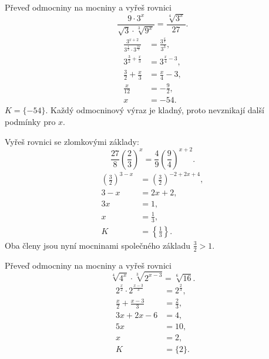 \documentclass[11pt,a4paper]{article}
\begin{document}
\begin{prikladReseniBox}[title={Příklad 5}]
Převeď odmocniny na mocniny a vyřeš rovnici
\[
\frac{9\cdot3^x}{\sqrt3\cdot\sqrt[3]{9^x}}=\frac{\sqrt[4]{3^x}}{27}.
\]
\tcblower
\[
\begin{aligned}
\frac{3^{x+2}}{3^{\frac{1}{2}}\cdot3^{\frac{2x}{3}}}&=\frac{3^{\frac{x}{4}}}{3^3},\\
3^{\frac{3}{2}+\frac{x}{3}}&=3^{\frac{x}{4}-3},\\
\frac{3}{2}+\frac{x}{3}&=\frac{x}{4}-3,\\
\frac{x}{12}&=-\frac{9}{2},\\
x&=-54.
\end{aligned}
\]
$K=\{-54\}$. Každý odmocninový výraz je kladný, proto nevznikají další podmínky pro $x$.
\end{prikladReseniBox}


\begin{prikladReseniBox}[title={Příklad 6}]
Vyřeš rovnici se zlomkovými základy:
\[
\frac{27}{8}\left(\frac{2}{3}\right)^x=\frac{4}{9}\left(\frac{9}{4}\right)^{x+2}.
\]
\tcblower
\[
\begin{aligned}
\left(\frac{3}{2}\right)^{3-x}&=\left(\frac{3}{2}\right)^{-2+2x+4},\\
3-x&=2x+2,\\
3x&=1,\\
x&=\frac{1}{3},\\
K&=\left\{\frac{1}{3}\right\}.
\end{aligned}
\]
Oba členy jsou nyní mocninami společného základu $\frac{3}{2}>1$.
\end{prikladReseniBox}

\begin{prikladReseniBox}[title={Příklad 7}]
Převeď odmocniny na mocniny a vyřeš rovnici
\[
\sqrt[4]{4^x}\cdot\sqrt[3]{2^{x-3}}=\sqrt[6]{16}.
\]
\tcblower
\[
\begin{aligned}
2^{\frac{x}{2}}\cdot 2^{\frac{x-3}{3}}&=2^{\frac{2}{3}},\\
\frac{x}{2}+\frac{x-3}{3}&=\frac{2}{3},\\
3x+2x-6&=4,\\
5x&=10,\\
x&=2,\\
K&=\{2\}.
\end{aligned}
\]
\end{prikladReseniBox}
\end{document}
